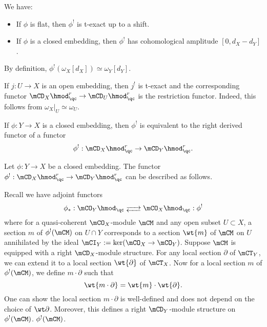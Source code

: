 	\begin{rem}
		We have:
		\begin{itemize}
			\item If $\phi$ is flat, then $\phi^!$ is t-exact up to a shift.
			\item If $\phi$ is a closed embedding, then $\phi^!$ has cohomological amplitude $[0,d_X-d_Y]$.
		\end{itemize}
	\end{rem}

	\begin{exam}
		By definition, $\phi^!(\omega_X[d_X])\simeq \omega_Y[d_Y]$.
	\end{exam}

	\begin{exam}
		If $j:U \to X$ is an open embedding, then $j^!$ is t-exact and the corresponding functor $\mCD_X\hmod^r_\qc\to \mCD_U\hmod^r_\qc$ is the restriction functor. Indeed, this follows from $\omega_X|_{U} \simeq \omega_U$.
	\end{exam}

	\begin{facts}
		If $\phi:Y \to X$ is a closed embedding, then $\phi^!$ is equivalent to the right derived functor of a functor
		\[
			\phi^!: \mCD_X\hmod^r_\qc \to \mCD_Y\hmod^r_\qc.
		\]
	\end{facts}

	\begin{constr}
		Let $\phi:Y \to X$ be a closed embedding. The functor $\phi^!: \mCD_X\hmod^r_\qc \to \mCD_Y\hmod^r_\qc$ can be described as follows. 

		Recall we have adjoint functors
		\[
			\phi_*: \mCO_Y\hmod_\qc\adj \mCO_X\hmod_\qc : \phi^! 
		\]
		where for a quasi-coherent $\mCO_X$-module $\mCM$ and any open subset $U\subset X$, a section $m$ of $\phi^!(\mCM)$ on $U\cap Y$ corresponds to a section $\wt{m}$ of $\mCM$ on $U$ annihilated by the ideal $\mCI_Y:=\ker(\mCO_X \to \mCO_Y)$. Suppose $\mCM$ is equipped with a right $\mCD_X$-module structure. For any local section $\partial$ of $\mCT_Y$, we can extend it to a local section $\wt{\partial}$ of $\mCT_X$. Now for a local section $m$ of $\phi^!(\mCM)$, we define $m\cdot \partial$ such that
		\[
			\wt{m\cdot \partial} = \wt{m} \cdot \wt{\partial}.
		\]
		One can show the local section $m\cdot \partial$ is well-defined and does not depend on the choice of $\wt\partial$. Moreover, this defines a right $\mCD_Y$-module structure on $\phi^!(\mCM)$. $\phi^!(\mCM)$.

	\end{constr}

